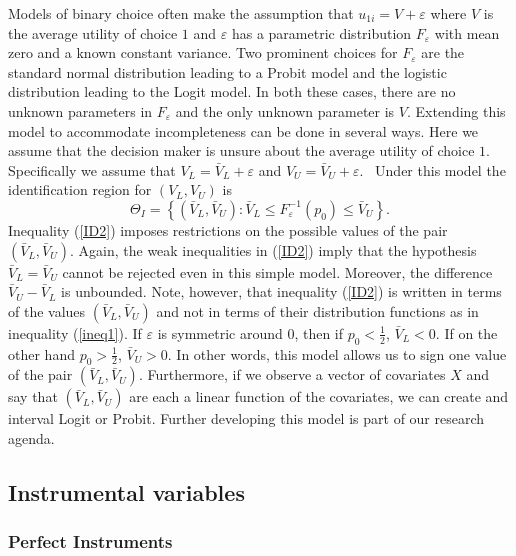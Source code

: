 \documentclass{article}
\begin{document}
Models of binary choice often make the assumption that $u_{1i}=V+\varepsilon 
$ where $V$ is the average utility of choice $1$ and $\varepsilon $ has a
parametric distribution $F_{\varepsilon }$ with mean zero and a known
constant variance. Two prominent choices for $F_{\varepsilon }$ are the
standard normal distribution leading to a Probit model and the logistic
distribution leading to the Logit model. In both these cases, there are no
unknown parameters in $F_{\varepsilon }$ and the only unknown parameter is $%
V $. Extending this model to accommodate incompleteness can be done in
several ways. Here we assume that the decision maker is unsure about the
average utility of choice $1$. Specifically we assume that $V_{L}=\bar{V}%
_{L}+\varepsilon $ and $V_{U}=\bar{V}_{U}+\varepsilon $. \ Under this model
the identification region for $\left( V_{L},V_{U}\right) $ is 
\begin{equation}
\Theta _{I}=\left\{ \left( \bar{V}_{L},\bar{V}_{U}\right) :\bar{V}_{L}\leq
F_{\varepsilon }^{-1}(p_{0})\leq \bar{V}_{U}\right\} .  \label{ID2}
\end{equation}%
Inequality (\ref{ID2}) imposes restrictions on the possible values of the
pair $\left( \bar{V}_{L},\bar{V}_{U}\right) $. Again, the weak inequalities
in (\ref{ID2}) imply that the hypothesis $\bar{V}_{L}=\bar{V}_{U}$ cannot be
rejected even in this simple model. Moreover, the difference $\bar{V}_{U}-%
\bar{V}_{L}$ is unbounded. Note, however, that inequality (\ref{ID2}) is
written in terms of the values $\left( \bar{V}_{L},\bar{V}_{U}\right) $ and
not in terms of their distribution functions as in inequality (\ref{ineq1}).
If $\varepsilon $ is symmetric around $0$, then if $p_{0}<\frac{1}{2}$, $%
\bar{V}_{L}<0$. If on the other hand $p_{0}>\frac{1}{2}$, $\bar{V}_{U}>0$.
In other words, this model allows us to sign one value of the pair $\left( 
\bar{V}_{L},\bar{V}_{U}\right) $. Furthermore, if we observe a vector of
covariates $X$ and say that $\left( \bar{V}_{L},\bar{V}_{U}\right) $ are
each a linear function of the covariates, we can create and interval Logit
or Probit. Further developing this model is part of our research agenda.

\subsection{Instrumental variables}

\subsubsection{Perfect Instruments}
\end{document}
